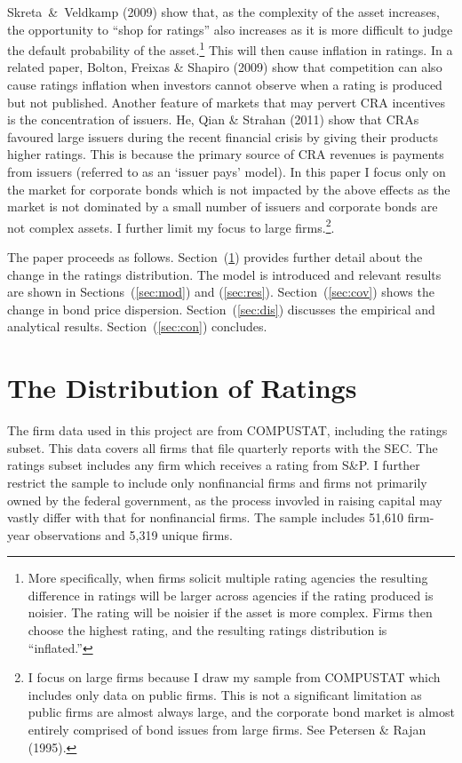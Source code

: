 \documentclass[notitlepage]{article}
\begin{document}
Skreta~\&~Veldkamp (2009) show that, as the complexity of the asset increases, the opportunity to ``shop for ratings'' also increases as it is more difficult to judge the default probability of the asset.\footnote{More specifically, when firms solicit multiple rating agencies the resulting difference in ratings will be larger across agencies if the rating produced is noisier. The rating will be noisier if the asset is more complex. Firms then choose the highest rating, and the resulting ratings distribution is ``inflated.''} This will then cause inflation in ratings. In a related paper, Bolton, Freixas \& Shapiro (2009) show that competition can also cause ratings inflation when investors cannot observe when a rating is produced but not published. Another feature of markets that may pervert CRA incentives is the concentration of issuers. He, Qian \& Strahan (2011) show that CRAs favoured large issuers during the recent financial crisis by giving their products higher ratings. This is because the primary source of CRA revenues is payments from issuers (referred to as an `issuer pays' model). In this paper I focus only on the market for corporate bonds which is not impacted by the above effects as the market is not dominated by a small number of issuers and corporate bonds are not complex assets. I further limit my focus to large firms.\footnote{I focus on large firms because I draw my sample from COMPUSTAT which includes only data on public firms. This is not a significant limitation as public firms are almost always large, and the corporate bond market is almost entirely comprised of bond issues from large firms. See Petersen \& Rajan (1995).}.

The paper proceeds as follows. Section~(\ref{sec:rat}) provides further detail about the change in the ratings distribution. The model is introduced and relevant results are shown in Sections~(\ref{sec:mod}) and (\ref{sec:res}). Section~(\ref{sec:cov}) shows the change in bond price dispersion. Section~(\ref{sec:dis}) discusses the empirical and analytical results. Section~(\ref{sec:con}) concludes.

\section{The Distribution of Ratings}
\label{sec:rat}
The firm data used in this project are from COMPUSTAT, including the ratings subset. This data covers all firms that file quarterly reports with the SEC. The ratings subset includes any firm which receives a rating from S\&P. I further restrict the sample to include only nonfinancial firms and firms not primarily owned by the federal government, as the process invovled in raising capital may vastly differ with that for nonfinancial firms. The sample includes 51,610 firm-year observations and 5,319 unique firms. 
\end{document}
